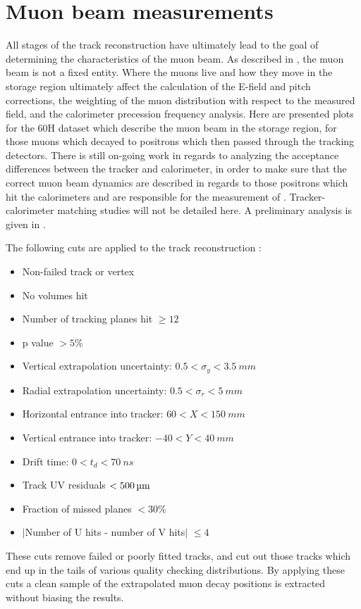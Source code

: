 \section{Muon beam measurements}
\label{sec:MuonBeamMeasurements}

All stages of the track reconstruction have ultimately lead to the goal of determining the characteristics of the muon beam. As described in , the muon beam is not a fixed entity. Where the muons live and how they move in the storage region ultimately affect the calculation of the E-field and pitch corrections, the weighting of the muon distribution with respect to the measured field, and the calorimeter precession frequency analysis. Here are presented plots for the 60H dataset which describe the muon beam in the storage region, for those muons which decayed to positrons which then passed through the tracking detectors. There is still on-going work in regards to analyzing the acceptance differences between the tracker and calorimeter, in order to make sure that the correct muon beam dynamics are described in regards to those positrons which hit the calorimeters and are responsible for the measurement of \wa. Tracker-calorimeter matching studies will not be detailed here. A preliminary analysis is given in .


The following cuts are applied to the track reconstruction \cite{trackcuts1,trackcuts2}:
\begin{itemize}
    \item{Non-failed track or vertex}
    \item{No volumes hit}
    \item{Number of tracking planes hit $\geq 12$}
    \item{p value $> 5\%$}
    \item{Vertical extrapolation uncertainty: $0.5 < \sigma_{y} < \SI{3.5}{mm}$}
    \item{Radial extrapolation uncertainty: $0.5 < \sigma_{r} < \SI{5}{mm}$}
    \item{Horizontal entrance into tracker: $60 < X < \SI{150}{mm}$}
    \item{Vertical entrance into tracker: $-40 < Y < \SI{40}{mm}$}
    \item{Drift time: $0 < t_{d} < \SI{70}{ns}$}
    \item{Track UV residuals $< \SI{500}{\micro m}$}
    \item{Fraction of missed planes $< 30\%$}
    \item{$|$Number of U hits - number of V hits$|$ $\leq 4$}
\end{itemize}
These cuts remove failed or poorly fitted tracks, and cut out those tracks which end up in the tails of various quality checking distributions. By applying these cuts a clean sample of the extrapolated muon decay positions is extracted without biasing the results.


